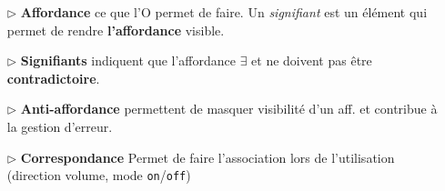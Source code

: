 \documentclass{report}
\begin{document}
\begin{multicols*}{3}
    \begin{itemize}
      \item [$\rhd $]  \textbf{Affordance} ce que l'O permet de faire.  
            Un \textit{signifiant} est un élément qui permet de rendre 
            \textbf{l'affordance} visible.   
          \item [$\rhd $]  \textbf{Signifiants} indiquent que l'affordance 
            $\exists$ et ne doivent pas être \textbf{contradictoire}.   

          \item [$\rhd $]  \textbf{Anti-affordance} permettent de masquer 
            visibilité d'un aff. et contribue à la gestion d'erreur. 

          \item [$\rhd $]   \textbf{Correspondance} Permet de faire 
            l'association lors de l'utilisation 
            (direction volume, mode \texttt{on}/\texttt{off})
    \end{itemize} 
    \end{multicols*}
\end{document}
